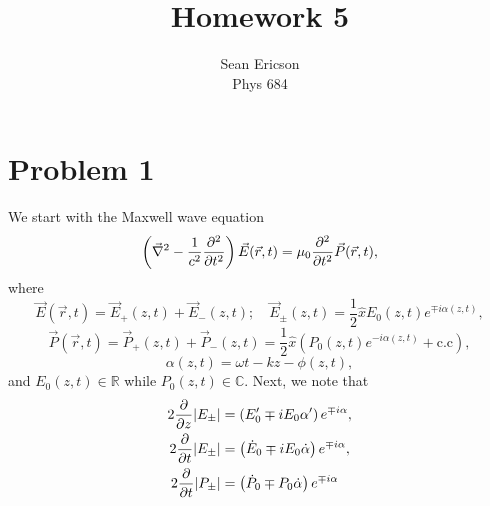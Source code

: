 \documentclass[12pt]{article}
\begin{document}
	
\title{Homework 5}
\author{Sean Ericson \\ Phys 684}
\maketitle

\section*{Problem 1}
We start with the Maxwell wave equation
\[ \left(\vec{\nabla}^2-\frac{1}{c^2}\pdv[2]{t}\right)\vec{E}(\vec{r},t) = \mu_0\pdv[2]{t}\vec{P}(\vec{r}, t), \]
where
\[ \vec{E}(\vec{r},t) = \vec{E}_+(z,t) + \vec{E}_-(z,t); \quad \vec{E}_\pm(z,t) = \frac{1}{2}\hat{x}E_0(z,t)e^{\mp i\alpha(z,t)}, \]
\[ \vec{P}(\vec{r},t) = \vec{P}_+(z,t) + \vec{P}_-(z,t) = \frac{1}{2}\hat{x}\left(P_0(z,t)e^{-i\alpha(z,t)} + \text{c.c}\right), \]
\[ \alpha(z,t) = \omega t - kz - \phi(z,t), \]
and $E_0(z,t)\in\mathbb{R}$ while $P_0(z,t)\in\mathbb{C}$.
Next, we note that
\begin{align*}
    2\pdv{z}\abs{E_\pm} &= \left(E_0' \mp iE_0\alpha'\right)e^{\mp i\alpha}, \\
    2\pdv{t}\abs{E_\pm} &= \left(\dot{E}_0 \mp iE_0\dot\alpha\right)e^{\mp i\alpha}, \\
    2\pdv{t}\abs{P_\pm} &= \left(\dot{P}_0 \mp P_0\dot\alpha\right)e^{\mp i\alpha}
\end{align*}
\end{document}
